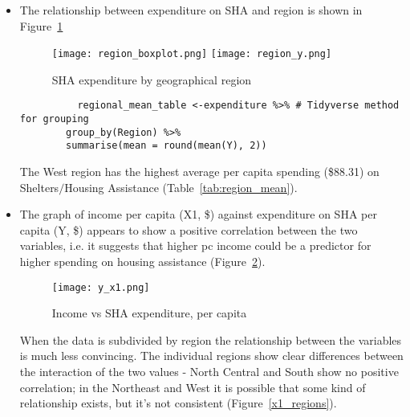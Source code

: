 \documentclass[12pt,letterpaper]{article}
\begin{document}
\begin{itemize}
		
		\vspace{.5cm}
		\item
		\clearpage
		The relationship between expenditure on SHA and region is shown in Figure~\ref{regions}

    \begin{figure}
      \texttt{[image: region\_boxplot.png]}
    	\texttt{[image: region\_y.png]}
      \caption{SHA expenditure by geographical region}\label{regions}
    \end{figure}
    
		\begin{verbatim}
		  regional_mean_table <-expenditure %>% # Tidyverse method for grouping
        group_by(Region) %>%
        summarise(mean = round(mean(Y), 2))
		\end{verbatim}
    
    

    The West region has the highest average per capita spending (\$88.31) on Shelters$/$Housing Assistance
    (Table~\ref{tab:region_mean}).

		
		\vspace{.5cm}

		\item
    The graph of income per capita (X1, \$) against expenditure on SHA per capita (Y, \$) appears
    to show a positive correlation between the two variables, i.e. it suggests that higher
    pc income could be a predictor for higher spending on housing assistance (Figure~\ref{y_x1}).

    \begin{figure}
      \texttt{[image: y\_x1.png]}
      \caption{Income vs SHA expenditure, per capita}\label{y_x1}
    \end{figure}


    When the data is subdivided by region the relationship between the variables is much less
    convincing.  The individual regions show clear differences between the interaction of the 
    two values - North Central and South show no positive correlation; in the Northeast and West
    it is possible that some kind of relationship exists, but it's not consistent
    (Figure~\ref{x1_regions}).
    

\end{itemize}
\end{document}
